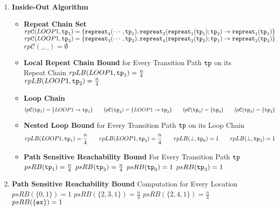 \begin{enumerate}
  \item \textbf{Inside-Out Algorithm}
  \begin{itemize}
    \item \textbf{Repeat Chain Set}
    \\
    $rp\mathcal{C}(LOOP1, \mathtt{tp}_1) = \{\mathtt{repreat}_4(\cdots, \mathtt{tp}_1), \mathtt{repreat}_3(\mathtt{repreat}_1(\mathtt{tp}_1); \mathtt{tp}_2) \to \mathtt{repreat}_1(\mathtt{tp}_1)\}$ \\
    $rp\mathcal{C}(LOOP1, \mathtt{tp}_2) = \{\mathtt{repreat}_3(\cdots, \mathtt{tp}_2), \mathtt{repreat}_4(\mathtt{repreat}_2(\mathtt{tp}_2); \mathtt{tp}_1) \to \mathtt{repreat}_2(\mathtt{tp}_2)\}$ \\
    $rp\mathcal{C}(\_, \_) = \emptyset$ 
    \item \textbf{{Local Repeat Chain Bound} }for Every Transition Path $\mathtt{tp}$ on its Repeat Chain
    $rpLB(LOOP1, \mathtt{tp}_1) = \frac{n}{4}$ \\
    $rpLB(LOOP1, \mathtt{tp}_2) = \frac{n}{4}$ 
    \item \textbf{Loop Chain}
    \[
        lp\mathcal{C}(\mathtt{tp}_1) = \{LOOP1\to \mathtt{tp}_1\}
        \qquad
        lp\mathcal{C}(\mathtt{tp}_2) = \{LOOP1\to \mathtt{tp}_2\}
        \qquad
        lp\mathcal{C}(\mathtt{tp}_0) = \{\mathtt{tp}_0\}
        \qquad
        lp\mathcal{C}(\mathtt{tp}_3) = \{\mathtt{tp}_3\}
      \]
    \item \textbf{Nested Loop Bound }for Every Transition Path $\mathtt{tp}$ on its Loop Chain
    \[
        rpLB(LOOP1, \mathtt{tp}_1) = \frac{n}{4}
        \qquad
        rpLB(LOOP1, \mathtt{tp}_2) = \frac{n}{4}
        \qquad
        rpLB(\bot, \mathtt{tp}_0) = 1
        \qquad
        rpLB(\bot, \mathtt{tp}_3) = 1
      \]
    \item \textbf{Path Sensitive Reachability Bound} For Every Transition Path $\mathtt{tp}$ 
    \\
    $psRB(\mathtt{tp}_1) = \frac{n}{4}$ \quad
    $psRB(\mathtt{tp}_2) = \frac{n}{4}$ \quad
    $psRB(\mathtt{tp}_0) = 1$ \quad
    $psRB(\mathtt{tp}_3) = 1$ 
  \end{itemize}
  \item \textbf{Path Sensitive Reachability Bound} Computation for Every Location
  \\
  $psRB(\{0, 1\}) = 1$ \quad
  $psRB(\{2, 3, 1 \}) = \frac{n}{4}$ \quad
  $psRB(\{2, 4, 1\}) = \frac{n}{4}$ \quad
  $psRB(\{\mathtt{ex}\}) = 1$ 
  \end{enumerate}